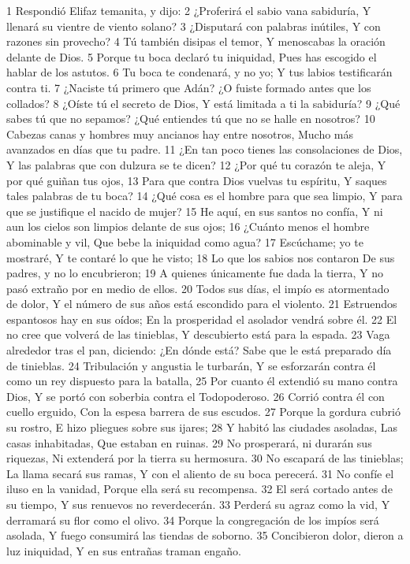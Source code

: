 1 Respondió Elifaz temanita, y dijo:  
2 ¿Proferirá el sabio vana sabiduría,  
Y llenará su vientre de viento solano?  
3 ¿Disputará con palabras inútiles,  
Y con razones sin provecho?  
4 Tú también disipas el temor,  
Y menoscabas la oración delante de Dios.  
5 Porque tu boca declaró tu iniquidad,  
Pues has escogido el hablar de los astutos.  
6 Tu boca te condenará, y no yo;  
Y tus labios testificarán contra ti.  
7 ¿Naciste tú primero que Adán?  
¿O fuiste formado antes que los collados?  
8 ¿Oíste tú el secreto de Dios,  
Y está limitada a ti la sabiduría?  
9 ¿Qué sabes tú que no sepamos?  
¿Qué entiendes tú que no se halle en nosotros? 
10 Cabezas canas y hombres muy ancianos hay entre nosotros,  
Mucho más avanzados en días que tu padre.  
11 ¿En tan poco tienes las consolaciones de Dios,  
Y las palabras que con dulzura se te dicen?  
12 ¿Por qué tu corazón te aleja,  
Y por qué guiñan tus ojos,  
13 Para que contra Dios vuelvas tu espíritu,  
Y saques tales palabras de tu boca?  
14 ¿Qué cosa es el hombre para que sea limpio,  
Y para que se justifique el nacido de mujer?  
15 He aquí, en sus santos no confía,  
Y ni aun los cielos son limpios delante de sus ojos;  
16 ¿Cuánto menos el hombre abominable y vil,  
Que bebe la iniquidad como agua?  
17 Escúchame; yo te mostraré,  
Y te contaré lo que he visto;  
18 Lo que los sabios nos contaron  
De sus padres, y no lo encubrieron;  
19 A quienes únicamente fue dada la tierra,  
Y no pasó extraño por en medio de ellos.  
20 Todos sus días, el impío es atormentado de dolor,  
Y el número de sus años está escondido para el violento. 
21 Estruendos espantosos hay en sus oídos;  
En la prosperidad el asolador vendrá sobre él.  
22 El no cree que volverá de las tinieblas,  
Y descubierto está para la espada.  
23 Vaga alrededor tras el pan, diciendo: ¿En dónde está?  
Sabe que le está preparado día de tinieblas.  
24 Tribulación y angustia le turbarán,  
Y se esforzarán contra él como un rey dispuesto para la batalla,  
25 Por cuanto él extendió su mano contra Dios,  
Y se portó con soberbia contra el Todopoderoso.  
26 Corrió contra él con cuello erguido, 
Con la espesa barrera de sus escudos.  
27 Porque la gordura cubrió su rostro,  
E hizo pliegues sobre sus ijares;  
28 Y habitó las ciudades asoladas,  
Las casas inhabitadas,  
Que estaban en ruinas.  
29 No prosperará, ni durarán sus riquezas,  
Ni extenderá por la tierra su hermosura.  
30 No escapará de las tinieblas;  
La llama secará sus ramas,  
Y con el aliento de su boca perecerá.  
31 No confíe el iluso en la vanidad,  
Porque ella será su recompensa.  
32 El será cortado antes de su tiempo,  
Y sus renuevos no reverdecerán.  
33 Perderá su agraz como la vid,  
Y derramará su flor como el olivo.  
34 Porque la congregación de los impíos será asolada,  
Y fuego consumirá las tiendas de soborno.  
35 Concibieron dolor, dieron a luz iniquidad,  
Y en sus entrañas traman engaño.  

